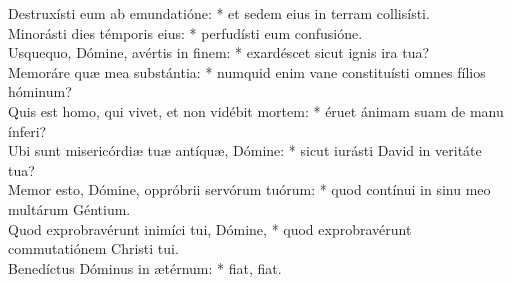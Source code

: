 {	Destruxísti eum ab emundatióne: * et sedem eius in terram collisísti. \\
	Minorásti dies témporis eius: * perfudísti eum confusióne. \\
	Usquequo, Dómine, avértis in finem: * exardéscet sicut ignis ira tua? \\
	Memoráre quæ mea substántia: * numquid enim vane constituísti omnes fílios hóminum? \\
	Quis est homo, qui vivet, et non vidébit mortem: * éruet ánimam suam de manu ínferi? \\
	Ubi sunt misericórdiæ tuæ antíquæ, Dómine: * sicut iurásti David in veritáte tua? \\
	Memor esto, Dómine, oppróbrii servórum tuórum: * quod contínui in sinu meo multárum Géntium. \\
	Quod exprobravérunt inimíci tui, Dómine, * quod exprobravérunt commutatiónem Christi tui. \\
	Benedíctus Dóminus in ætérnum: * fiat, fiat. \\
}

